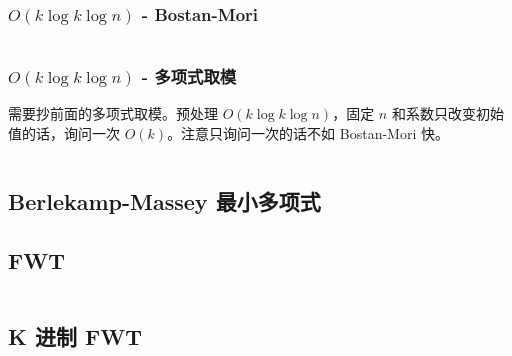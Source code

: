 					\subsubsection*{$O(k \log k \log n)$ - Bostan-Mori}
						\inputminted{cpp}{src/Math/快速线性递推-bostan-mori.cpp}
					\subsubsection*{$O(k \log k \log n)$ - 多项式取模}
						需要抄前面的多项式取模。预处理 $O(k \log k \log n)$，固定 $n$ 和系数只改变初始值的话，询问一次 $O(k)$。注意只询问一次的话不如 Bostan-Mori 快。
						\inputminted{cpp}{src/Math/快速线性递推-多项式取模.cpp}
				\subsection{Berlekamp-Massey 最小多项式}
					
				\subsection{FWT}
					\inputminted{cpp}{src/Math/FWT.cpp}
				\subsection{K 进制 FWT}
					\inputminted{cpp}{src/tbr/fwt.cpp}

